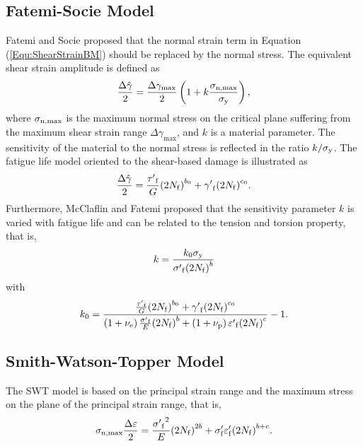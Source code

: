 \documentclass[preprint,5p,twocolumn,11pt,sort&compress]{elsarticle}
\begin{document}
\subsection{Fatemi-Socie Model}
Fatemi and Socie \cite{Fatemi1988} proposed that the normal strain term in Equation (\ref{Equ:ShearStrainBM}) should be replaced by the normal stress.
The equivalent shear strain amplitude is defined as
\begin{equation}
\frac{{\Delta \hat \gamma }}{2} = \frac{{\Delta {\gamma _{\max }}}}{2}\left( {1 + k\frac{{{\sigma _{\rm n,\max}}}}{{{\sigma _{\rm y}}}}} \right),
\end{equation}
where
$\sigma _{\rm n,\max}$ is the maximum normal stress on the critical plane suffering from the maximum shear strain range $\Delta {\gamma _{\max}}$, and $k$ is a material parameter. The sensitivity of the material to the normal stress is reflected in the ratio $k/\sigma _{\rm y}$.
The fatigue life model oriented to the shear-based damage is illustrated as
\begin{equation}
\frac{{\Delta \hat \gamma }}{2} = \frac{{{{\tau '}_{\rm f}}}}{G}{\left( {2{N_{\rm f}}} \right)^{{b_0}}} + {{\gamma '}_{\rm f}}{\left( {2{N_{\rm f}}} \right)^{{c_0}}}.
\end{equation}
Furthermore, McClaflin and Fatemi \cite{McClaflin2004} proposed that the sensitivity parameter $k$ is varied with fatigue life and can be related to the tension and torsion property, that is,
\begin{equation}
k =  \frac{{k_0 {\sigma _{\rm y}}}}{{{{\sigma '}_{\rm f}}{{\left( {2{N_{\rm f}}} \right)}^b}}}
\end{equation}
with
\[
k_0 =  {\frac{{\frac{{{{\tau '}_{\rm f}}}}{G}{{\left( {2{N_{\rm f}}} \right)}^{{b_0}}} + {{\gamma '}_{\rm f}}{{\left( {2{N_{\rm f}}} \right)}^{{c_0}}}}}{{\left( {1 + {\nu _{\rm e}}} \right)\frac{{{{\sigma '}_{\rm f}}}}{E}{{\left( {2{N_{\rm f}}} \right)}^b} + \left( {1 + {\nu _{\rm p}}} \right){{\varepsilon '}_{\rm f}}{{\left( {2{N_{\rm f}}} \right)}^c}}} - 1} .
\]


\subsection{Smith-Watson-Topper Model}
The SWT model  \cite{Socie2000} is based on the principal strain range and the maximum stress on the plane of the principal
strain range, that is,
\[
{\sigma _{\rm n, \max}}\frac{{\Delta \varepsilon }}{2} = \frac{{{{\sigma '}_{\rm f}}^2}}{E}{\left( {2{N_{\rm f}}} \right)^{2b}} + {\sigma '_{\rm f}}{\varepsilon '_{\rm f}}{\left( {2{N_{\rm f}}} \right)^{b + c}}.
\]
\end{document}

